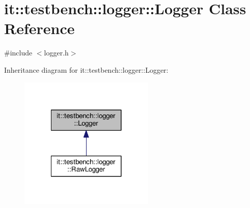 \hypertarget{classit_1_1testbench_1_1logger_1_1Logger}{\section{it\-:\-:testbench\-:\-:logger\-:\-:Logger Class Reference}
\label{dd/d58/classit_1_1testbench_1_1logger_1_1Logger}
}


{\ttfamily \#include $<$logger.\-h$>$}



Inheritance diagram for it\-:\-:testbench\-:\-:logger\-:\-:Logger\-:
\nopagebreak
\begin{figure}[H]
\begin{center}
\leavevmode
\includegraphics[width=182pt]{db/d4b/classit_1_1testbench_1_1logger_1_1Logger__inherit__graph}
\end{center}
\end{figure}
